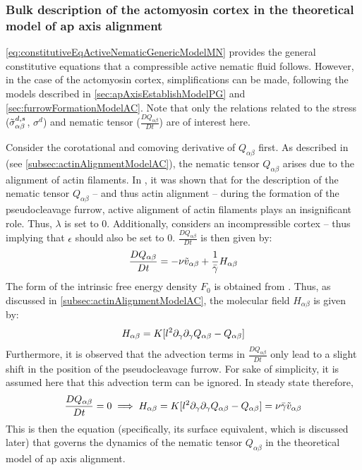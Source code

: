 \subsubsection{Bulk description of the actomyosin cortex in the theoretical model of \ac{ap} axis alignment}
\autoref{eq:constitutiveEqActiveNematicGenericModelMN} provides the general constitutive equations that a compressible active nematic fluid follows. However, in the case of the actomyosin cortex, simplifications can be made, following the models described in \autoref{sec:apAxisEstablishModelPG} and \autoref{sec:furrowFormationModelAC}. Note that only the relations related to the stress ($\Tilde{\sigma}^{d,s}_{\alpha\beta}$, $\sigma^d$) and nematic tensor ($\frac{DQ_{\alpha\beta}}{Dt}$) are of interest here. 

Consider the corotational and comoving derivative of $Q_{\alpha\beta}$ first. As described in \cite{reymann2016cortical} (see \autoref{subsec:actinAlignmentModelAC}), the nematic tensor $Q_{\alpha\beta}$ arises due to the alignment of actin filaments. In \citep{reymann2016cortical}, it was shown that for the description of the nematic tensor $Q_{\alpha\beta}$ -- and thus actin alignment -- during the formation of the pseudocleavage furrow, active alignment of actin filaments plays an insignificant role. Thus, $\lambda$ is set to \num{0}. Additionally, \cite{reymann2016cortical} considers an incompressible cortex -- thus implying that $\epsilon$ should also be set to \num{0}. $\frac{DQ_{\alpha\beta}}{Dt}$ is then given by:
\begin{equation}
    \frac{DQ_{\alpha\beta}}{Dt} = -\nu \Tilde{v}_{\alpha\beta} + \frac{1}{\bar{\gamma}}H_{\alpha\beta}
\end{equation}
The form of the intrinsic free energy density $F_0$ is obtained from \cite{reymann2016cortical}. Thus, as discussed in \autoref{subsec:actinAlignmentModelAC}, the molecular field $H_{\alpha\beta}$ is given by:
\begin{equation}
    H_{\alpha\beta} = K[l^2\inlinePartial{\gamma}{\inlinePartial{\gamma}{Q_{\alpha\beta}}} - Q_{\alpha\beta}]
\end{equation}
Furthermore, it is observed that the advection terms in $\frac{DQ_{\alpha\beta}}{Dt}$ only lead to a slight shift in the position of the pseudocleavage furrow. For sake of simplicity, it is assumed here that this advection term can be ignored. In steady state therefore,
\begin{equation}\label{eq:dynamicsNematicsBulkModelMN}
    \frac{DQ_{\alpha\beta}}{Dt} = 0 \implies H_{\alpha\beta} = K[l^2\inlinePartial{\gamma}{\inlinePartial{\gamma}{Q_{\alpha\beta}}} - Q_{\alpha\beta}] = \nu\bar{\gamma} \Tilde{v}_{\alpha\beta}
\end{equation}
This is then the equation (specifically, its surface equivalent, which is discussed later) that governs the dynamics of the nematic tensor $Q_{\alpha\beta}$ in the theoretical model of \ac{ap} axis alignment.

